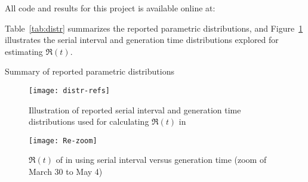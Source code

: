 All code and results for this project is available online at:\\
\par
Table~\ref{tab:distr} summarizes
the reported parametric \covid distributions, and
Figure~\ref{fig:distr-refs} illustrates
the serial interval and generation time distributions
explored for estimating $\Re(t)$.
\par
\begin{table}[h]
  \caption{Summary of reported parametric \covid distributions}
  
  \label{tab:distr}
\end{table}
\par
\begin{figure}[h]
  \centering
  \texttt{[image: distr-refs]}
  \caption{Illustration of reported serial interval and generation time
    distributions used for calculating $\Re(t)$ in \covid}
  \label{fig:distr-refs}
\end{figure}
\par
\begin{figure}[h]
  \centering
  \texttt{[image: Re-zoom]}
  \caption{$\Re(t)$ of \covid in \gta using
    serial interval versus generation time
    (zoom of March 30 to May 4)}
  \label{fig:Re-zoom}
\end{figure}